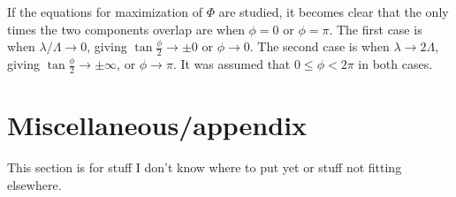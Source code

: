 \documentclass[10pt,a4paper,draft]{scrartcl}
\begin{document}
	If the equations for maximization of $\Phi$ are studied, it becomes clear that the only times the two components overlap are when $\phi = 0$ or $\phi = \pi$. The first case is when $\lambda/\Lambda \rightarrow 0$, giving $\tan{\frac{\phi}{2}} \rightarrow \pm 0$ or $\phi \rightarrow 0$. The second case is when $\lambda \rightarrow 2\Lambda$, giving $\tan{\frac{\phi}{2}} \rightarrow \pm \infty$, or $\phi \rightarrow \pi$. It was assumed that $0 \leq \phi < 2\pi$ in both cases.
	
	\appendix
	
	\section{Miscellaneous/appendix}
	This section is for stuff I don't know where to put yet or stuff not fitting elsewhere.
	
\end{document}
